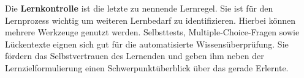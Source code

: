 Die \textbf{Lernkontrolle} ist die letzte zu nennende Lernregel. \cite[S. 15]{Vontobel.2006} Sie ist für den Lernprozess wichtig um weiteren Lernbedarf zu identifizieren. Hierbei können mehrere Werkzeuge genutzt werden. Selbsttests, Multiple-Choice-Fragen sowie Lückentexte eignen sich gut für die automatisierte Wissensüberprüfung. Sie fördern das Selbstvertrauen des Lernenden und geben ihm neben der Lernzielformulierung einen Schwerpunktüberblick über das gerade Erlernte. \cite[S. 72f.]{Drummer.2011} %


